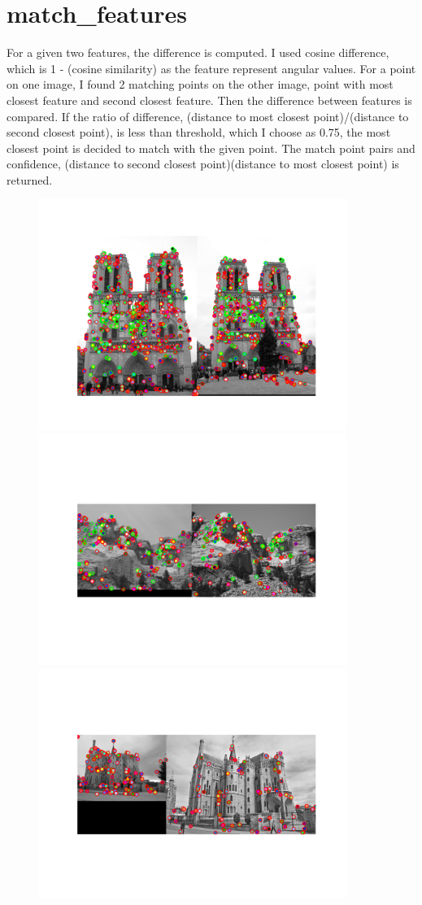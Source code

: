 \section*{match\_features}
For a given two features, the difference is computed. I used cosine difference, which is 1 - (cosine similarity) as the feature represent angular values. For a point on one image, I found 2 matching points on the other image, point with most closest feature and second closest feature. Then the difference between features is compared. If the ratio of difference, (distance to most closest point)/(distance to second closest point), is less than threshold, which I choose as 0.75, the most closest point is decided to match with the given point. The match point pairs and confidence, (distance to second closest point)(distance to most closest point) is returned. 

\begin{figure}[h]
    \centering
    \includegraphics[width=10cm]{../code/eval_ND.png}
    \includegraphics[width=10cm]{../code/eval_MR.png}
    \includegraphics[width=10cm]{../code/eval_EG.png}
    \label{feature points for the given images}
\end{figure}



